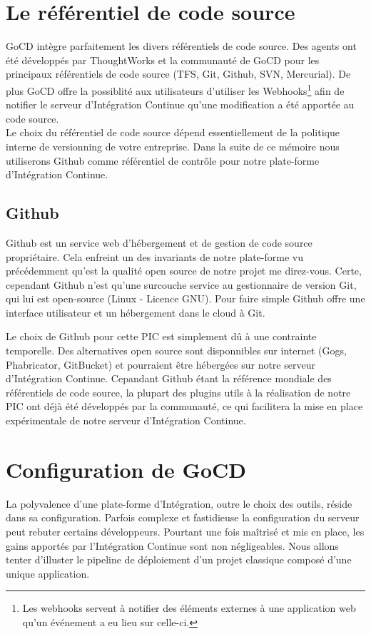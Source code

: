     \section{Le référentiel de code source}\label{Repository}
    GoCD intègre parfaitement les divers référentiels de code source. Des agents ont été développés par ThoughtWorks et la communauté de GoCD pour les principaux référentiels de code source (TFS, Git, Github, SVN, Mercurial). De plus GoCD offre la possiblité aux utilisateurs d'utiliser les Webhooks\footnote{Les webhooks servent à notifier des éléments externes à une application web qu'un événement a eu lieu sur celle-ci.} afin de notifier le serveur d'Intégration Continue qu'une modification a été apportée au code source.\\

    Le choix du référentiel de code source dépend essentiellement de la politique interne de versionning de votre entreprise. Dans la suite de ce mémoire nous utiliserons Github comme référentiel de contrôle pour notre plate-forme d'Intégration Continue.

      \subsection{Github}
      Github est un service web d'hébergement et de gestion de code source propriétaire. Cela enfreint un des invariants de notre plate-forme vu précédemment qu'est la qualité open source de notre projet me direz-vous. Certe, cependant Github n'est qu'une surcouche service au gestionnaire de version Git, qui lui est open-source (Linux - Licence GNU). Pour faire simple Github offre une interface utilisateur et un hébergement dans le cloud à Git.

      Le choix de Github pour cette PIC est simplement dû à une contrainte temporelle. Des alternatives open source sont disponnibles sur internet (Gogs, Phabricator, GitBucket) et pourraient être hébergées sur notre serveur d'Intégration Continue. Cepandant Github étant la référence mondiale des référentiels de code source, la plupart des plugins utils à la réalisation de notre PIC ont déjà été développés par la communauté, ce qui facilitera la mise en place expérimentale de notre serveur d'Intégration Continue.

    \section{Configuration de GoCD}
    La polyvalence d'une plate-forme d'Intégration, outre le choix des outils, réside dans sa configuration. Parfois complexe et fastidieuse la configuration du serveur peut rebuter certains développeurs. Pourtant une fois maîtrisé et mis en place, les gains apportés par l'Intégration Continue sont non négligeables. Nous allons tenter d'illuster le pipeline de déploiement d'un projet classique composé d'une unique application.

